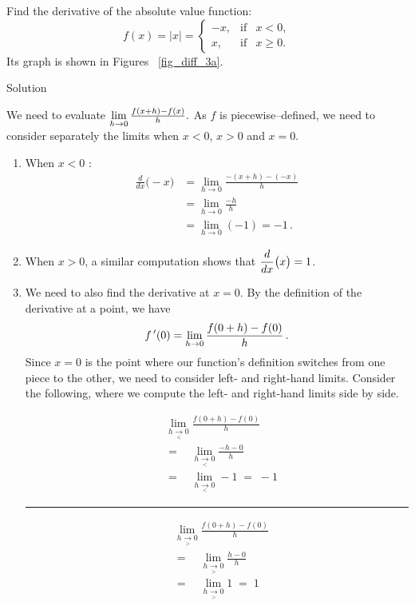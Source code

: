 \begin{example}\label{ex_not_diff}
Find the derivative of the absolute value function:
$$f(x) = |x| = \left\{\begin{array}{rcl} -x, & \mbox{if} & x<0, \\ x,  & \mbox{if} & x\geq 0. \end{array}\right.%
$$
Its graph is shown in Figures~ \ref{fig_diff_3a}.

Solution 

We need to evaluate $\displaystyle \lim_{h\to0}\tfrac{f(x+h)-f(x)}{h}.$ As $f$ is piecewise--defined, we need to consider separately the limits when $x<0$,  $x>0$ and $x=0$. 

\begin{enumerate}
    \item When $x<0$ :
    \allowdisplaybreaks
	\begin{align*}
	\frac{d}{dx}\big(-x\big) 	&= \lim_{h\to 0}\frac{-(x+h) - (-x)}{h} \\[0.2cm]
														&=	\lim_{h\to 0}\frac{-h}{h}\\[0.2cm]
														&=	\lim_{h\to 0}(-1)=-1 \,.
	\end{align*}
 \item When $x>0$, a similar computation shows that $\displaystyle \frac{d}{dx}\big(x\big) = 1$. 

 \item We need to also find the derivative at $x=0$. By the definition of the derivative at a point, we have $$f\,'(0) = \lim_{h\to0}\frac{f(0+h)-f(0)}{h}\,.$$ Since $x=0$ is the point where our function's definition switches from one piece to the other, we need to consider left- and right-hand limits. Consider the following, where we compute the left- and right-hand limits side by side.

\noindent\begin{minipage}[b]{.5\linewidth}
\begin{align*}
&\lim_{h\underset{<}{\rightarrow}0}\frac{f(0+h)-f(0)}{h}\\
&=\quad\lim_{h\underset{<}{\rightarrow}0}\frac{-h-0}{h}  \\
&=\quad\lim_{h\underset{<}{\rightarrow}0}-1\;=\;-1
\end{align*}
\end{minipage}\rule{.5pt}{70pt}
\begin{minipage}[b]{.5\linewidth}
\begin{align*}
&\lim_{h\underset{>}{\rightarrow}0}\frac{f(0+h)-f(0)}{h} \\
&=\quad\lim_{h\underset{>}{\rightarrow}0}\frac{h-0}{h}  \\
&=\quad\lim_{h\underset{>}{\rightarrow}0}1\;=\;1
\end{align*}
\end{minipage}
		

\end{enumerate}
\end{example}
